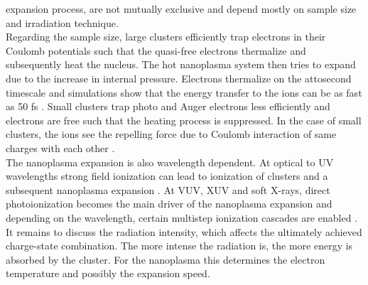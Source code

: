expansion process, are not mutually exclusive and depend mostly on sample size and irradiation technique.\\
Regarding the sample size, large clusters efficiently trap electrons in their Coulomb potentials such that the quasi-free electrons thermalize and subsequently heat the nucleus. The hot nanoplasma system then tries to expand due to the increase in internal pressure. Electrons thermalize on the attosecond timescale and simulations show that the energy transfer to the ions can be as fast as 50 fs \citep{Arbeiter-2010-PRA}. Small clusters trap photo and Auger electrons less efficiently and electrons are free such that the heating process is suppressed. In the case of small clusters, the ions see the repelling force due to Coulomb interaction of same charges with each other \citep{Lezius-1998-PRL}.\\
The nanoplasma expansion is also wavelength dependent. At optical to UV wavelengths strong field ionization can lead to ionization of clusters and a subsequent nanoplasma expansion \citep{Springate-2000-PRA}. At VUV, XUV and soft X-rays, direct photoionization becomes the main driver of the nanoplasma expansion and depending on the wavelength, certain multistep ionization cascades are enabled \citep{Arbeiter-2011-NJP}. It remains to discuss the radiation intensity, which affects the ultimately achieved charge-state combination. The more intense the radiation is, the more energy is absorbed by the cluster. For the nanoplasma this determines the electron temperature and possibly the expansion speed.
%
%
%
